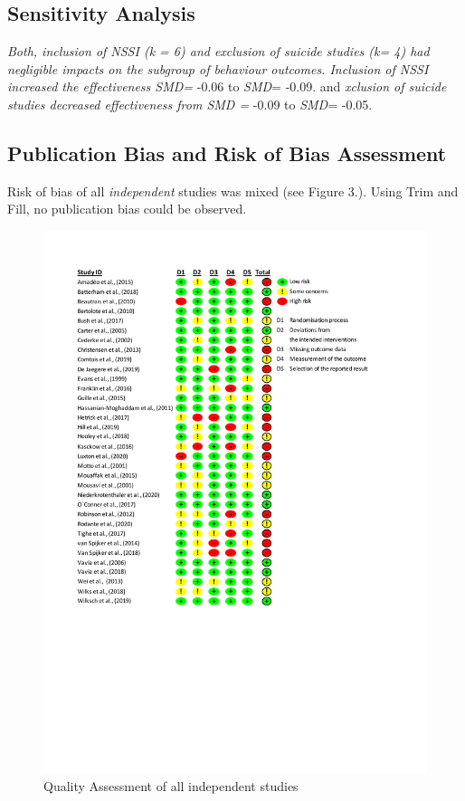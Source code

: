 \documentclass[
  english,
  man]{apa6}
\begin{document}
\hypertarget{sensitivity-analysis-1}{%
\subsection{Sensitivity Analysis}\label{sensitivity-analysis-1}}

\emph{Both, inclusion of NSSI (k = 6) and exclusion of suicide studies (k= 4) had negligible impacts on the subgroup of behaviour outcomes. Inclusion of NSSI increased the effectiveness SMD=} -0.06 to \emph{SMD}= -0.09. and \emph{xclusion of suicide studies decreased effectiveness from SMD =} -0.09 to \emph{SMD}= -0.05.

\hypertarget{publication-bias-and-risk-of-bias-assessment}{%
\subsection{Publication Bias and Risk of Bias Assessment}\label{publication-bias-and-risk-of-bias-assessment}}

Risk of bias of all \emph{independent} studies was mixed (see Figure 3.). Using Trim and Fill, no publication bias could be observed.

\begin{figure}
\centering
\includegraphics{01_Plots/RoB-II.pdf}
\caption{Quality Assessment of all independent studies}
\end{figure}
\end{document}
